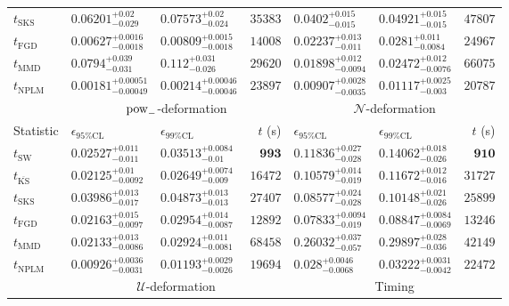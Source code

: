 \begin{tabular}{l|llr|llr}
	$t_{\mathrm{SKS}}$ & $0.06201_{-0.029}^{+0.02}$ & $0.07573_{-0.024}^{+0.02}$ & $35383$ & $0.0402_{-0.015}^{+0.015}$ & $0.04921_{-0.015}^{+0.015}$ & $47807$ \\
	$t_{\mathrm{FGD}}$ & ${\mathbf{0.00627_{-0.0018}^{+0.0016}}}$ & ${\mathbf{0.00809_{-0.0018}^{+0.0015}}}$ & $14008$ & $0.02237_{-0.011}^{+0.013}$ & $0.0281_{-0.0084}^{+0.011}$ & $24967$ \\
	$t_{\mathrm{MMD}}$ & $0.0794_{-0.031}^{+0.039}$ & $0.112_{-0.026}^{+0.031}$ & $29620$ & ${\mathbf{0.01898_{-0.0094}^{+0.012}}}$ & ${\mathbf{0.02472_{-0.0076}^{+0.012}}}$ & $66075$ \\
\rowcolor{red!35}	$t_{\mathrm{NPLM}}$ & $0.00181_{-0.00049}^{+0.00051}$ & $0.00214_{-0.00046}^{+0.00046}$ & $23897$ & $0.00907_{-0.0035}^{+0.0028}$ & $0.01117_{-0.003}^{+0.0025}$ & $20787$ \\
	\toprule
	\multicolumn{1}{c}{} & \multicolumn{3}{c}{$\rm{pow}_{-}$-deformation} & \multicolumn{3}{c}{$\mathcal{N}$-deformation} \\
Statistic & $\epsilon_{95\%\mathrm{CL}}$ & $\epsilon_{99\%\mathrm{CL}}$ & $t$ (s) & $\epsilon_{95\%\mathrm{CL}}$ & $\epsilon_{99\%\mathrm{CL}}$ & $t$ (s) \\
	\midrule
	$t_{\mathrm{SW}}$ & $0.02527_{-0.011}^{+0.011}$ & $0.03513_{-0.01}^{+0.0084}$ & ${\mathbf{993}}$ & $0.11836_{-0.028}^{+0.027}$ & $0.14062_{-0.026}^{+0.018}$ & ${\mathbf{910}}$ \\
	$t_{\overline{\mathrm{KS}}}$ & ${\mathbf{0.02125_{-0.0092}^{+0.01}}}$ & ${\mathbf{0.02649_{-0.009}^{+0.0074}}}$ & $16472$ & $0.10579_{-0.019}^{+0.014}$ & $0.11672_{-0.016}^{+0.012}$ & $31727$ \\
	$t_{\mathrm{SKS}}$ & $0.03986_{-0.017}^{+0.013}$ & $0.04873_{-0.013}^{+0.013}$ & $27407$ & $0.08577_{-0.028}^{+0.024}$ & $0.10148_{-0.026}^{+0.021}$ & $25899$ \\
	$t_{\mathrm{FGD}}$ & $0.02163_{-0.0097}^{+0.015}$ & $0.02954_{-0.0087}^{+0.014}$ & $12892$ & ${\mathbf{0.07833_{-0.019}^{+0.0094}}}$ & ${\mathbf{0.08847_{-0.0069}^{+0.0084}}}$ & $13246$ \\
	$t_{\mathrm{MMD}}$ & $0.02133_{-0.0086}^{+0.013}$ & $0.02924_{-0.0081}^{+0.011}$ & $68458$ & $0.26032_{-0.057}^{+0.037}$ & $0.29897_{-0.036}^{+0.028}$ & $42149$ \\
\rowcolor{red!35}	$t_{\mathrm{NPLM}}$ & $0.00926_{-0.0031}^{+0.0036}$ & $0.01193_{-0.0026}^{+0.0029}$ & $19694$ & $0.028_{-0.0068}^{+0.0046}$ & $0.03222_{-0.0042}^{+0.0031}$ & $22472$ \\
	\toprule
	\multicolumn{1}{c}{} & \multicolumn{3}{c}{$\mathcal{U}$-deformation} & \multicolumn{3}{c}{Timing} \\

\end{tabular}
